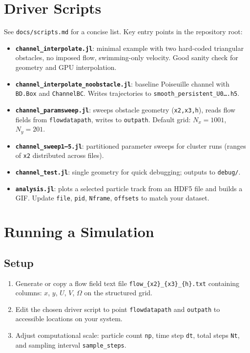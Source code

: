 \documentclass[11pt]{article}
\begin{document}
\section{Driver Scripts}
See \texttt{docs/scripts.md} for a concise list. Key entry points in the repository root:
\begin{itemize}[leftmargin=*]
  \item \textbf{\texttt{channel\_interpolate.jl}}: minimal example with two hard-coded triangular obstacles, no imposed flow, swimming-only velocity. Good sanity check for geometry and GPU interpolation.
  \item \textbf{\texttt{channel\_interpolate\_noobstacle.jl}}: baseline Poiseuille channel with \texttt{BD.Box} and \texttt{ChannelBC}. Writes trajectories to \texttt{smooth\_persistent\_U0\dots.h5}.
  \item \textbf{\texttt{channel\_paramsweep.jl}}: sweeps obstacle geometry (\verb|x2,x3,h|), reads flow fields from \texttt{flowdatapath}, writes to \texttt{outpath}. Default grid: $N_x=1001$, $N_y=201$.
  \item \textbf{\texttt{channel\_sweep1--5.jl}}: partitioned parameter sweeps for cluster runs (ranges of \verb|x2| distributed across files).
  \item \textbf{\texttt{channel\_test.jl}}: single geometry for quick debugging; outputs to \texttt{debug/}.
  \item \textbf{\texttt{analysis.jl}}: plots a selected particle track from an HDF5 file and builds a GIF. Update \texttt{file}, \texttt{pid}, \texttt{Nframe}, \texttt{offsets} to match your dataset.
\end{itemize}

\section{Running a Simulation}
\subsection{Setup}
\begin{enumerate}[leftmargin=*]
  \item Generate or copy a flow field text file \verb|flow_{x2}_{x3}_{h}.txt| containing columns: $x$, $y$, $U$, $V$, $\Omega$ on the structured grid.
  \item Edit the chosen driver script to point \texttt{flowdatapath} and \texttt{outpath} to accessible locations on your system.
  \item Adjust computational scale: particle count \texttt{np}, time step \texttt{dt}, total steps \texttt{Nt}, and sampling interval \texttt{sample\_steps}.
\end{enumerate}
\end{document}
